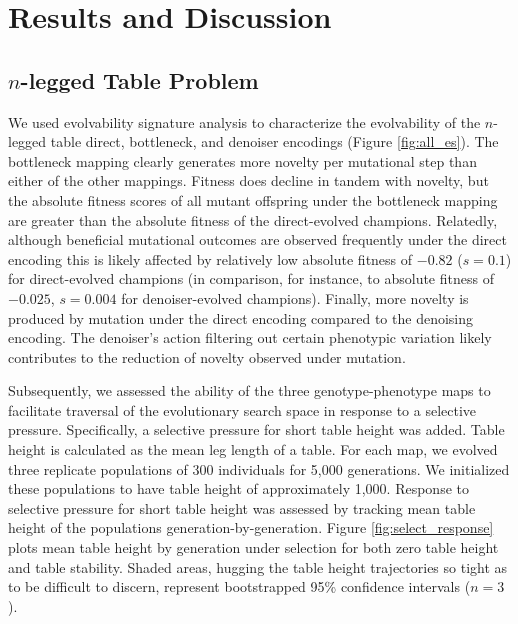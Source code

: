 \section{Results and Discussion} \label{sec:results}

\subsection{$n$-legged Table Problem}



We used evolvability signature analysis to characterize the evolvability of the $n$-legged table direct, bottleneck, and denoiser encodings (Figure \ref{fig:all_es}).
The bottleneck mapping clearly generates more novelty per mutational step than either of the other mappings.
Fitness does decline in tandem with novelty, but the absolute fitness scores of all mutant offspring under the bottleneck mapping are greater than the absolute fitness of the direct-evolved champions.
Relatedly, although beneficial mutational outcomes are observed frequently under the direct encoding this is likely affected by relatively low absolute fitness of $-0.82$ ($s=0.1$) for direct-evolved champions (in comparison, for instance, to absolute fitness of $-0.025$, $s=0.004$ for denoiser-evolved champions).
Finally, more novelty is produced by mutation under the direct encoding compared to the denoising encoding.
The denoiser's action filtering out certain phenotypic variation likely contributes to the reduction of novelty observed under mutation.



Subsequently, we assessed the ability of the three genotype-phenotype maps to facilitate traversal of the evolutionary search space in response to a selective pressure.
Specifically, a selective pressure for short table height was added.
Table height is calculated as the mean leg length of a table.
For each map, we evolved three replicate populations of 300 individuals for 5,000 generations.
We initialized these populations to have table height of approximately 1,000.
Response to selective pressure for short table height was assessed by tracking mean table height of the populations generation-by-generation.
Figure \ref{fig:select_response} plots mean table height by generation under selection for both zero table height and table stability.
Shaded areas, hugging the table height trajectories so tight as to be difficult to discern, represent bootstrapped 95\% confidence intervals ($n=3$).

